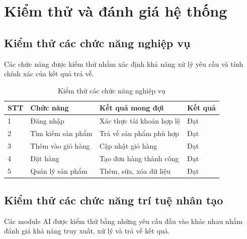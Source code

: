 \documentclass{report}
\begin{document}
\section{Kiểm thử và đánh giá hệ thống}

\subsection{Kiểm thử các chức năng nghiệp vụ}

Các chức năng được kiểm thử nhằm xác định
khả năng xử lý yêu cầu và tính chính xác
của kết quả trả về.

\begin{table}[htbp]
    \centering
    \caption{Kiểm thử các chức năng nghiệp vụ}
    \label{tab:business-testing}
    \renewcommand{\arraystretch}{1.3}
    \begin{tabular}{|p{1cm}|p{4cm}|p{5cm}|p{2cm}|}
        \hline
        \textbf{STT} &
        \textbf{Chức năng} &
        \textbf{Kết quả mong đợi} &
        \textbf{Kết quả} \\
        \hline
        1 & Đăng nhập &
        Xác thực tài khoản hợp lệ & Đạt \\
        \hline
        2 & Tìm kiếm sản phẩm &
        Trả về sản phẩm phù hợp & Đạt \\
        \hline
        3 & Thêm vào giỏ hàng &
        Cập nhật giỏ hàng & Đạt \\
        \hline
        4 & Đặt hàng &
        Tạo đơn hàng thành công & Đạt \\
        \hline
        5 & Quản lý sản phẩm &
        Thêm, sửa, xóa dữ liệu & Đạt \\
        \hline
    \end{tabular}
\end{table}

\subsection{Kiểm thử các chức năng trí tuệ nhân tạo}

Các module AI được kiểm thử bằng những yêu cầu
đầu vào khác nhau nhằm đánh giá khả năng
truy xuất, xử lý và trả về kết quả.
\end{document}
